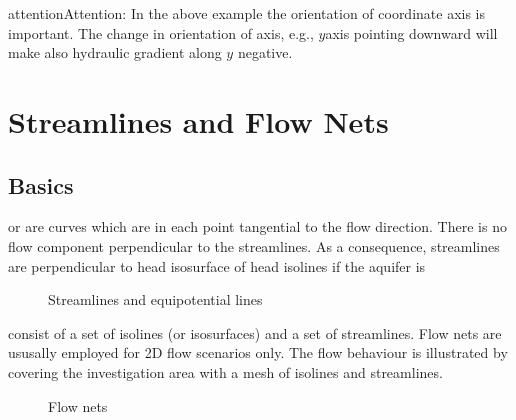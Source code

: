 \documentclass[letterpaper,10pt,english]{jupyterBook}
\begin{document}
\begin{sphinxadmonition}{attention}{Attention:}
\sphinxAtStartPar
In the above example the orientation of co\sphinxhyphen{}ordinate axis is important. The change in orientation of axis, e.g., \(y\)\sphinxhyphen{}axis pointing downward will make also hydraulic gradient along \(y\) negative.
\end{sphinxadmonition}


\section{Streamlines and Flow Nets}
\label{\detokenize{content/flow/L6/16_darcy_law_3D:streamlines-and-flow-nets}}

\subsection{Basics}
\label{\detokenize{content/flow/L6/16_darcy_law_3D:basics}}
\sphinxAtStartPar
{} or  are curves which are in each point tangential to the flow direction. There is no flow component perpendicular to the streamlines. As a consequence, streamlines are perpendicular to head iso\sphinxhyphen{}surface of head isolines if the aquifer is 

\begin{figure}[htbp]
\centering
\capstart

\noindent{}
\caption{Streamlines and equipotential lines}\label{\detokenize{content/flow/L6/16_darcy_law_3D:streamlines}}\end{figure}

\sphinxAtStartPar
{} consist of a set of isolines (or isosurfaces) and a set of streamlines. Flow nets are ususally employed for 2D flow scenarios only. The flow behaviour is illustrated by covering the investigation area with a  mesh of isolines and streamlines.

\begin{figure}[htbp]
\centering
\capstart

\noindent{}
\caption{Flow nets}\label{\detokenize{content/flow/L6/16_darcy_law_3D:flownets}}\end{figure}
\end{document}
